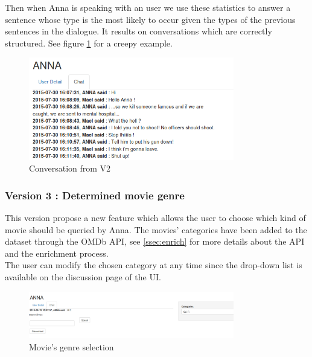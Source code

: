 Then when Anna is speaking with an user we use these statistics to answer a sentence whose type is the most likely to occur given the types of the previous sentences in the dialogue. It results on conversations which are correctly structured. See figure \ref{fig:convST} for a creepy example.
\begin{figure}[!h]
\begin{center}
\includegraphics[width=0.80\textwidth]{./img/convST.png}
\end{center}
\caption{Conversation from V2}
\label{fig:convST}
\end{figure}

\subsubsection{Version 3 : Determined movie genre}
\label{sssec:v_genre}
This version propose a new feature which allows the user to choose which kind of movie should be queried by Anna. The movies' categories have been added to the dataset through the OMDb API, see \ref{ssec:enrich} for more details about the API and the enrichment process.\\
The user can modify the chosen category at any time since the drop-down list is available on the discussion page of the UI.
\begin{figure}[!h]
\begin{center}
\includegraphics[width=0.80\textwidth]{./img/convCat.png}
\end{center}
\caption{Movie's genre selection}
\label{fig:convCat}
\end{figure}

